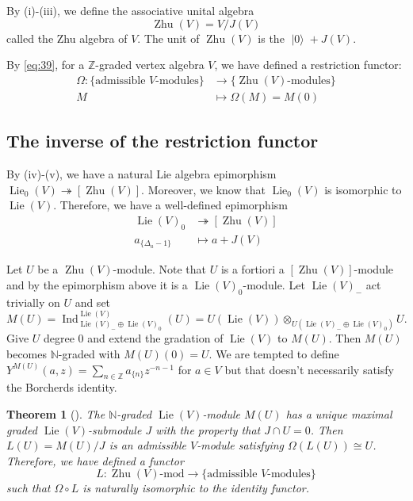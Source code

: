 \documentclass[a4paper, 12pt, reqno]{amsart}
\newtheorem{theorem}{Theorem}[section]
\theoremstyle{remark}
\numberwithin{equation}{subsection}
\DeclareMathOperator{\Ind}{Ind}
\DeclareMathOperator{\vac}{|0\rangle}
\DeclareMathOperator{\Lie}{Lie}
\DeclareMathOperator{\Zhu}{Zhu}
\begin{document}
By (i)-(iii), we define the associative unital algebra
\begin{equation*}
  \Zhu(V) = V/J(V)
\end{equation*}
called the Zhu algebra of $V$.
The unit of $\Zhu(V)$ is the $\vac + J(V)$.

By \eqref{eq:39}, for a $\mathbb{Z}$-graded vertex algebra $V$, we have defined a restriction functor:
\begin{align*}
  \Omega: \{\text{admissible $V$-modules}\} &\to \{\text{$\Zhu(V)$-modules}\} \\
  M & \mapsto \Omega(M) = M(0)
\end{align*}

\subsection{The inverse of the restriction functor}
\label{sec:inverse-restr-funct}

By (iv)-(v), we have a natural Lie algebra epimorphism $\Lie_0(V) \twoheadrightarrow [\Zhu(V)]$.
Moreover, we know that $\Lie_0(V)$ is isomorphic to $\Lie(V)$.
Therefore, we have a well-defined epimorphism
\begin{align*}
  \Lie(V)_0 &\twoheadrightarrow [\Zhu(V)] \\
  a_{\{\Delta_a - 1\}} &\mapsto a + J(V)
\end{align*}

Let $U$ be a $\Zhu(V)$-module.
Note that $U$ is a fortiori a $[\Zhu(V)]$-module and by the epimorphism above it is a $\Lie(V)_0$-module.
Let $\Lie(V)_-$ act trivially on $U$ and set
\begin{equation*}
  M(U) = \Ind^{\Lie(V)}_{\Lie(V)_- \oplus \Lie(V)_0}(U) = U(\Lie(V)) \otimes_{U(\Lie(V)_- \oplus \Lie(V)_0)}U.
\end{equation*}
Give $U$ degree $0$ and extend the gradation of $\Lie(V)$ to $M(U)$.
Then $M(U)$ becomes $\mathbb{N}$-graded with $M(U)(0) = U$.
We are tempted to define $Y^{M(U)}(a, z) = \sum_{n \in \mathbb{Z}}a_{\{n\}}z^{-n - 1}$ for $a \in V$ but that doesn't necessarily satisfy the Borcherds identity.

\begin{theorem}[{\cite[\S2]{de_sole_finite_2006}}]
  \label{thr:37}
  The $\mathbb{N}$-graded $\Lie(V)$-module $M(U)$ has a unique maximal graded $\Lie(V)$-submodule $J$ with the property that $J \cap U = 0$.
  Then $L(U) = M(U)/J$ is an admissible $V$-module satisfying $\Omega(L(U)) \cong U$.
  Therefore, we have defined a functor
  \begin{equation*}
  L: \Zhu(V)\text{-mod} \to \{\text{admissible $V$-modules}\}
  \end{equation*}
  such that $\Omega \circ L$ is naturally isomorphic to the identity functor.
\end{theorem}
\end{document}
